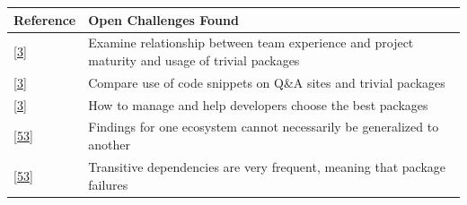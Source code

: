 \documentclass[]{book}
\begin{document}
\begin{longtable}[]{@{}ll@{}}
\toprule
\begin{minipage}[b]{0.13\columnwidth}\raggedright\strut
Reference\strut
\end{minipage} & \begin{minipage}[b]{0.29\columnwidth}\raggedright\strut
Open Challenges Found\strut
\end{minipage}\tabularnewline
\midrule
\endhead
\begin{minipage}[t]{0.13\columnwidth}\raggedright\strut
{[}\protect\hyperlink{ref-Abdalkareem2017}{3}{]}\strut
\end{minipage} & \begin{minipage}[t]{0.29\columnwidth}\raggedright\strut
Examine relationship between team experience and project maturity and
usage of trivial packages\strut
\end{minipage}\tabularnewline
\begin{minipage}[t]{0.13\columnwidth}\raggedright\strut
{[}\protect\hyperlink{ref-Abdalkareem2017}{3}{]}\strut
\end{minipage} & \begin{minipage}[t]{0.29\columnwidth}\raggedright\strut
Compare use of code snippets on Q\&A sites and trivial packages\strut
\end{minipage}\tabularnewline
\begin{minipage}[t]{0.13\columnwidth}\raggedright\strut
{[}\protect\hyperlink{ref-Abdalkareem2017}{3}{]}\strut
\end{minipage} & \begin{minipage}[t]{0.29\columnwidth}\raggedright\strut
How to manage and help developers choose the best packages\strut
\end{minipage}\tabularnewline
\begin{minipage}[t]{0.13\columnwidth}\raggedright\strut
{[}\protect\hyperlink{ref-Decan2018}{53}{]}\strut
\end{minipage} & \begin{minipage}[t]{0.29\columnwidth}\raggedright\strut
Findings for one ecosystem cannot necessarily be generalized to
another\strut
\end{minipage}\tabularnewline
\begin{minipage}[t]{0.13\columnwidth}\raggedright\strut
{[}\protect\hyperlink{ref-Decan2018}{53}{]}\strut
\end{minipage} & \begin{minipage}[t]{0.29\columnwidth}\raggedright\strut
Transitive dependencies are very frequent, meaning that package failures

\end{minipage}
\end{longtable}
\end{document}
